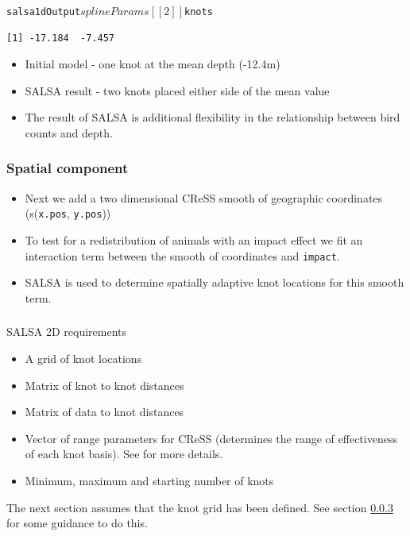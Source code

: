 \begin{frame}[fragile]
\frametitle{}
\begin{knitrout}\footnotesize
{}\color{fgcolor}\begin{kframe}
\begin{alltt}
salsa1dOutput$splineParams[[2]]$knots
\end{alltt}
\begin{verbatim}
[1] -17.184  -7.457
\end{verbatim}
\end{kframe}
\end{knitrout}

\begin{itemize}
\item Initial model - one knot at the mean depth (-12.4m) 
\item SALSA result - two knots placed either side of the mean value
\item The result of SALSA is additional flexibility in the relationship between bird counts and depth.
\end{itemize}
\end{frame}

\begin{frame}[fragile]
\frametitle{Spatial component}
\begin{itemize}
\item Next we add a two dimensional CReSS smooth of geographic coordinates (s({\tt x.pos}, {\tt y.pos}))
\item To test for a redistribution of animals with an impact effect we fit an interaction term between the smooth of coordinates and {\tt impact}.
\item SALSA is used to determine spatially adaptive knot locations for this smooth term.
\end{itemize}
\end{frame}

\begin{frame}
\frametitle{}
\begin{block}{SALSA 2D requirements}
\begin{itemize}
\item A grid of knot locations
\item Matrix of knot to knot distances 
\item Matrix of data to knot distances
\item Vector of range parameters for CReSS (determines the range of effectiveness of each knot basis).  See \citep{ScottH2013} for more details.
\item Minimum, maximum and starting number of knots
\end{itemize}
\end{block}
The next section assumes that the knot grid has been defined. See section \ref{} for some guidance to do this.
\end{frame}

